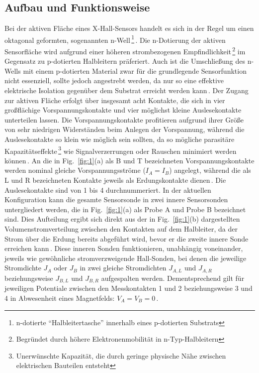 \documentclass[12pt, a4paper]{article}
\begin{document}
\subsection{Aufbau und Funktionsweise}
Bei der aktiven Fläche eines X-Hall-Sensors handelt es sich in der Regel um einen oktagonal geformten, sogenannten n-Well\,\footnote{n-dotierte ``Halbleitertasche'' innerhalb eines p-dotierten Substrats}\,\cite{cres18}. \newline
Die n-Dotierung der aktiven Sensorfläche wird aufgrund einer höheren strombezogenen Empfindlichkeit\,\footnote{Begründet durch höhere Elektronenmobilität in n-Typ-Halbleitern} im Gegensatz zu p-dotierten Halbleitern präferiert. %
Auch ist die Umschließung des n-Wells mit einem p-dotierten Material zwar für die grundlegende Sensorfunktion nicht essenziell, %
sollte jedoch  angestrebt werden, da nur so eine effektive elektrische Isolation gegenüber dem Substrat erreicht werden kann\,\cite{cres20}.\newline
Der Zugang zur aktiven Fläche erfolgt über insgesamt acht Kontakte, die sich in vier großflächige Vorspannungskontakte und vier möglichst kleine Auslesekontakte unterteilen lassen. Die Vorspannungskontakte profitieren aufgrund ihrer Größe von sehr niedrigen Widerständen beim Anlegen der Vorspannung, während die Auslesekontakte so klein wie möglich sein sollten, da so mögliche parasitäre Kapazitätseffekte\,\footnote{Unerwünschte Kapazität, die durch geringe physische Nähe zwischen elektrischen Bauteilen entsteht} %
wie Signalverzerrungen oder Rauschen minimiert werden können\,\cite{cres19}.\newline
An die in Fig.~\ref{fig:1}(a) als B und T bezeichneten Vorspannungskontakte werden nominal gleiche Vorspannungsströme ($I_A=I_B$) angelegt, während die als L und R bezeichneten Kontakte jeweils als Erdungskontakte dienen\,\cite{cres19}. Die Auslesekontakte sind von 1 bis 4 durchnummeriert.\newline
In der aktuellen Konfiguration kann die gesamte Sensorsonde in zwei innere Sensorsonden untergliedert werden, die in Fig.~\ref{fig:1}(a) als Probe A und Probe B bezeichnet sind. Dies Aufteilung ergibt sich direkt aus der in Fig.~\ref{fig:1}(b) dargestellten Volumenstromverteilung zwischen den Kontakten auf dem Halbleiter, da der Strom über die Erdung bereits abgeführt wird, bevor er die zweite innere Sonde erreichen kann\,\cite{cres20}.
\newline
Diese inneren Sonden funktionieren, unabhängig voneinander, jeweils wie gewöhnliche stromverzweigende Hall-Sonden, bei denen die jeweilige Stromdichte $J_A$ oder $J_B$ in zwei gleiche Stromdichten $J_{A,L}$ und $J_{A,R}$ beziehungsweise $J_{B,L}$ und $J_{B,R}$ aufgespalten werden. Dementsprechend gilt für jeweiligen Potentiale zwischen den Messkontakten 1 und 2 beziehungsweise 3 und 4 in Abwesenheit eines Magnetfelds: $V_A=V_B=0$\,\cite{cres21}.\newline
\end{document}
